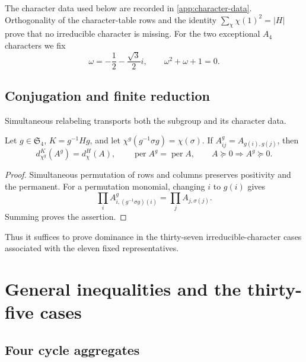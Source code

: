 \documentclass[10pt,twoside]{siamart1116}
\newcommand{\Sn}{\mathfrak S}
\newcommand{\per}{\operatorname{per}}
\newcommand{\psd}{\succeq 0}
\begin{document}
The character data used below are recorded in
\ref{app:character-data}.  Orthogonality of the character-table rows
and the identity $\sum_\chi\chi(1)^2=|H|$ prove that no irreducible character
is missing.  For the two exceptional $A_4$ characters we fix
\begin{equation}\label{eq:omega}
 \omega=-\frac12-\frac{\sqrt3}{2}i,
 \qquad \omega^2+\omega+1=0.
\end{equation}

\subsection{Conjugation and finite reduction}

Simultaneous relabeling transports both the subgroup and its character data.

\begin{lemma}[Transport]\label{lem:transport}
Let $g\in\Sn_4$, $K=g^{-1}Hg$, and let
$\chi^g(g^{-1}\sigma g)=\chi(\sigma)$.  If
$A^g_{ij}=A_{g(i),g(j)}$, then
\[
 d_{\chi^g}^{K}(A^g)=d_\chi^H(A),\qquad \per A^g=\per A,
 \qquad A\psd\Longrightarrow A^g\psd.
\]
\end{lemma}

\begin{proof}
Simultaneous permutation of rows and columns preserves positivity and the
permanent.  For a permutation monomial, changing $i$ to $g(i)$ gives
\[
 \prod_i A^g_{i,(g^{-1}\sigma g)(i)}
 =\prod_j A_{j,\sigma(j)}.
\]
Summing proves the assertion.
\end{proof}

Thus it suffices to prove dominance in the thirty-seven irreducible-character
cases associated with the eleven fixed representatives.

\section{General inequalities and the thirty-five cases}\label{sec:elementary-cases}

\subsection{Four cycle aggregates}
\end{document}
